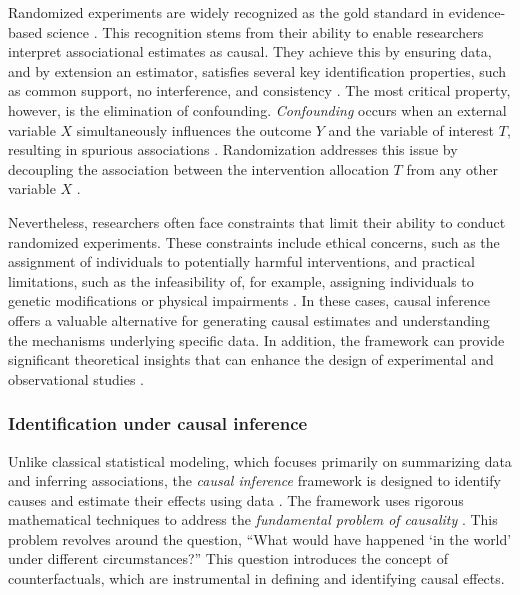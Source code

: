 \documentclass[
  authoryear,
  review,
  1p]{elsarticle}
\begin{document}
Randomized experiments are widely recognized as the gold standard in
evidence-based science \citep{Hariton_et_al_2018, Hansson_2014}. This
recognition stems from their ability to enable researchers interpret
associational estimates as causal. They achieve this by ensuring data,
and by extension an estimator, satisfies several key identification
properties, such as common support, no interference, and consistency
\citep{Morgan_et_al_2014, Neal_2020}. The most critical property,
however, is the elimination of confounding. \emph{Confounding} occurs
when an external variable \(X\) simultaneously influences the outcome
\(Y\) and the variable of interest \(T\), resulting in spurious
associations \citep{Everitt_et_al_2010}. Randomization addresses this
issue by decoupling the association between the intervention allocation
\(T\) from any other variable \(X\)
\citep{Morgan_et_al_2014, Neal_2020}.

Nevertheless, researchers often face constraints that limit their
ability to conduct randomized experiments. These constraints include
ethical concerns, such as the assignment of individuals to potentially
harmful interventions, and practical limitations, such as the
infeasibility of, for example, assigning individuals to genetic
modifications or physical impairments \citep{Neal_2020}. In these cases,
causal inference offers a valuable alternative for generating causal
estimates and understanding the mechanisms underlying specific data. In
addition, the framework can provide significant theoretical insights
that can enhance the design of experimental and observational studies
\citep{McElreath_2020}.

\subsubsection{Identification under causal
inference}\label{sec-appendixB2}

Unlike classical statistical modeling, which focuses primarily on
summarizing data and inferring associations, the \emph{causal inference}
framework is designed to identify causes and estimate their effects
using data \citep{Shaughnessy_et_al_2010, Neal_2020}. The framework uses
rigorous mathematical techniques to address the \emph{fundamental
problem of causality}
\citep{Pearl_2009, Pearl_et_al_2016, Morgan_et_al_2014}. This problem
revolves around the question, ``What would have happened `in the world'
under different circumstances?'' This question introduces the concept of
counterfactuals, which are instrumental in defining and identifying
causal effects.
\end{document}
